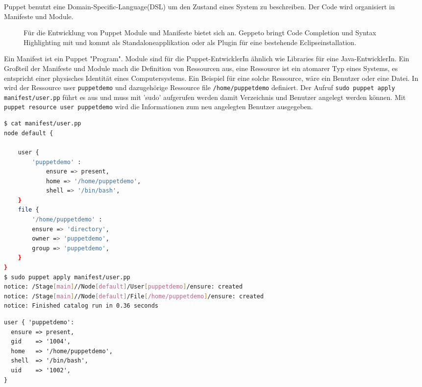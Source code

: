 \documentclass[12pt,a4paper,ngerman]{article}
\begin{document}
Puppet benutzt eine Domain-Specific-Language(DSL) um den Zustand eines System zu beschreiben. Der Code wird organisiert in Manifeste und Module.

\begin{figure}
\vspace{-20pt}
\begin{boxedminipage}{8cm}
Für die Entwicklung von Puppet Module und Manifeste bietet sich \cite{geppeto} an. Geppeto bringt Code Completion und Syntax Highlighting mit und kommt als Standaloneapplikation oder als Plugin für eine bestehende Eclipseinstallation. 
\end{boxedminipage}
\vspace{-20pt}
\end{figure}

Ein Manifest ist ein Puppet "Program". Module sind für die Puppet-EntwicklerIn ähnlich wie Libraries für eine Java-EntwicklerIn. Ein Großteil der Manifeste und Module mach die Definition von Ressourcen aus, eine Ressource ist ein atomarer Typ eines Systems, es entspricht einer physisches Identität eines Computersystems. Ein Beispiel für eine solche Ressource, wäre ein Benutzer oder eine Datei. In  wird der Ressource user \lstinline$puppetdemo$ und dazugehörige Ressource file \lstinline$/home/puppetdemo$ definiert. Der Aufruf \lstinline$sudo puppet apply manifest/user.pp$ führt es aus und muss mit 'sudo' aufgerufen werden damit Verzeichnis und Benutzer angelegt werden können.
Mit \lstinline$puppet resource user puppetdemo$ wird die Informationen zum neu angelegten Benutzer ausgegeben.


\begin{lstlisting}[language=sh,caption=User mit Puppet anlegen, label=puppet-add-user]
$ cat manifest/user.pp 
node default {

    user {
        'puppetdemo' :
            ensure => present,
            home => '/home/puppetdemo',
            shell => '/bin/bash',
    }
    file {
        '/home/puppetdemo' :
        ensure => 'directory',
        owner => 'puppetdemo',
        group => 'puppetdemo',
    }
}
$ sudo puppet apply manifest/user.pp 
notice: /Stage[main]//Node[default]/User[puppetdemo]/ensure: created
notice: /Stage[main]//Node[default]/File[/home/puppetdemo]/ensure: created
notice: Finished catalog run in 0.36 seconds
\end{lstlisting}
\begin{lstlisting}[language=puppet,caption=Anzeige der Benutzerinformation in Puppet, label=puppet-add-user-info]
user { 'puppetdemo':
  ensure => present,
  gid    => '1004',
  home   => '/home/puppetdemo',
  shell  => '/bin/bash',
  uid    => '1002',
}
\end{lstlisting}
\end{document}
